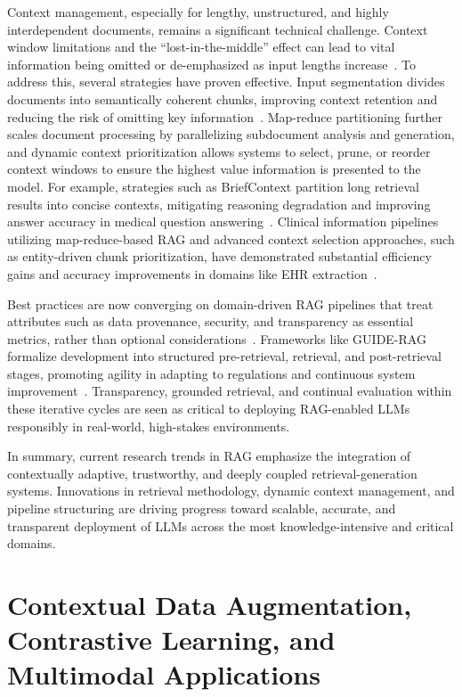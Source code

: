 \documentclass[sigconf]{acmart}
\begin{document}
Context management, especially for lengthy, unstructured, and highly interdependent documents, remains a significant technical challenge. Context window limitations and the ``lost-in-the-middle'' effect can lead to vital information being omitted or de-emphasized as input lengths increase~\cite{ref49}. To address this, several strategies have proven effective. Input segmentation divides documents into semantically coherent chunks, improving context retention and reducing the risk of omitting key information~\cite{ref5, ref10, ref15, ref16, ref43, ref49, ref52, ref54, ref55}. Map-reduce partitioning further scales document processing by parallelizing subdocument analysis and generation, and dynamic context prioritization allows systems to select, prune, or reorder context windows to ensure the highest value information is presented to the model. For example, strategies such as BriefContext partition long retrieval results into concise contexts, mitigating reasoning degradation and improving answer accuracy in medical question answering~\cite{ref49}. Clinical information pipelines utilizing map-reduce-based RAG and advanced context selection approaches, such as entity-driven chunk prioritization, have demonstrated substantial efficiency gains and accuracy improvements in domains like EHR extraction~\cite{ref3, ref5, ref52, ref55}.

Best practices are now converging on domain-driven RAG pipelines that treat attributes such as data provenance, security, and transparency as essential metrics, rather than optional considerations~\cite{ref63, ref64}. Frameworks like GUIDE-RAG formalize development into structured pre-retrieval, retrieval, and post-retrieval stages, promoting agility in adapting to regulations and continuous system improvement~\cite{ref5, ref63}. Transparency, grounded retrieval, and continual evaluation within these iterative cycles are seen as critical to deploying RAG-enabled LLMs responsibly in real-world, high-stakes environments.

In summary, current research trends in RAG emphasize the integration of contextually adaptive, trustworthy, and deeply coupled retrieval-generation systems. Innovations in retrieval methodology, dynamic context management, and pipeline structuring are driving progress toward scalable, accurate, and transparent deployment of LLMs across the most knowledge-intensive and critical domains.

\section{Contextual Data Augmentation, Contrastive Learning, and Multimodal Applications}
\end{document}
